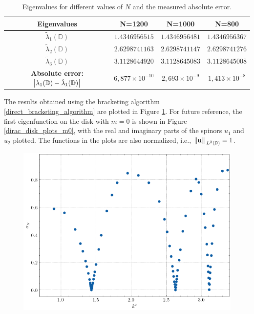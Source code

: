 \begin{table}[htbp]
    \centering
    \begin{tabular}{cccc}
        \toprule
        \textbf{Eigenvalues} & \textbf{N=1200} & \textbf{N=1000} & \textbf{N=800} \\
        \midrule
        \(\tilde{\lambda}_1(\mathbb{D})\) & $1.4346956515$ & $1.4346956481$ & $1.4346956367$ \\
        \(\tilde{\lambda}_2(\mathbb{D})\) & $2.6298741163$ & $2.6298741147$ & $2.6298741276$ \\
        \(\tilde{\lambda}_3(\mathbb{D})\) & $3.1128644920$ & $3.1128645083$ & $3.1128645008$ \\
        \midrule
        \textbf{Absolute error: } \(\abs{\lambda_1(\mathbb{D}) - \tilde{\lambda}_1(\mathbb{D})}\) & $6,877\times 10^{-10}$ & $2,693\times 10^{-9}$ & $1,413\times 10^{-8}$ \\
        \bottomrule
    \end{tabular}
    \caption{Eigenvalues for different values of \(N\) and the measured absolute error.}
    \label{tab:eigenvalues_disk_val}
\end{table}

The results obtained using the bracketing algorithm \ref{direct_bracketing_algorithm} are plotted in Figure \ref{dirac_disk_alg_m0}. For future reference, the first eigenfunction on the disk with \(m=0\) is shown in Figure \ref{dirac_disk_plots_m0}, with the real and imaginary parts of the spinors \(u_1\) and \(u_2\) plotted. The functions in the plots are also normalized, i.e., \(\norm*{\mathbf{u}}_{L^2(\mathbb{D})}=1\).

\begin{figure}[!htb]
    \centering
    \includegraphics[width=0.5\linewidth]{Images/Dirac/circle_m_0_alg_points_158_inner_eta_05.png}
    \label{dirac_disk_alg_m0}
\end{figure}

